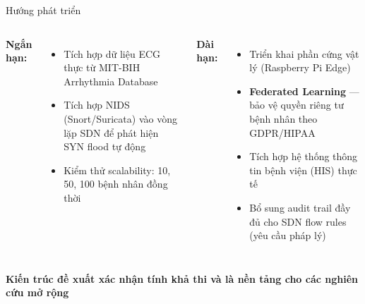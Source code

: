 \documentclass[aspectratio=169, 12pt]{beamer}
\begin{document}
\begin{frame}{Hướng phát triển}

\begin{columns}[T]
\textbf{Ngắn hạn:}
\begin{itemize}
  \item Tích hợp dữ liệu ECG thực từ MIT-BIH Arrhythmia Database
  \item Tích hợp NIDS (Snort/Suricata) vào vòng lặp SDN để phát hiện SYN flood tự động
  \item Kiểm thử scalability: 10, 50, 100 bệnh nhân đồng thời
\end{itemize}

\textbf{Dài hạn:}
\begin{itemize}
  \item Triển khai phần cứng vật lý (Raspberry Pi Edge)
  \item \textbf{Federated Learning} — bảo vệ quyền riêng tư bệnh nhân theo GDPR/HIPAA
  \item Tích hợp hệ thống thông tin bệnh viện (HIS) thực tế
  \item Bổ sung audit trail đầy đủ cho SDN flow rules (yêu cầu pháp lý)
\end{itemize}
\end{columns}

\vspace{0.4cm}
\begin{center}
\textcolor{ptitblue}{\textbf{Kiến trúc đề xuất xác nhận tính khả thi và là nền tảng cho các nghiên cứu mở rộng}}
\end{center}

\end{frame}
\end{document}
